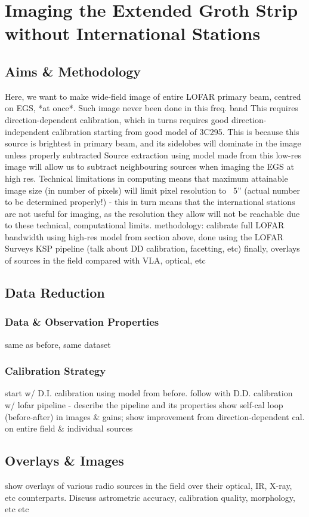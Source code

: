 \chapter{Imaging the Extended Groth Strip without International Stations}

\section{Aims \& Methodology}

\pg
Here, we want to make wide-field image of entire LOFAR primary beam, centred on EGS, *at once*. Such image never been done in this freq. band
\pg
This requires direction-dependent calibration, which in turns requires good direction-independent calibration starting from good model of 3C295. This is because this source is brightest in primary beam, and its sidelobes will dominate in the image unless properly subtracted
\pg
Source extraction using model made from this low-res image will allow us to subtract neighbouring sources when imaging the EGS at high res.
\pg
Technical limitations in computing means that maximum attainable image size (in number of pixels) will limit pixel resolution to ~5'' (actual number to be determined properly!) - this in turn means that the international stations are not useful for imaging, as the resolution they allow will not be reachable due to these technical, computational limits.
\pg
methodology: calibrate full LOFAR bandwidth using high-res model from section above, done using the LOFAR Surveys KSP pipeline (talk about DD calibration, facetting, etc)
finally, overlays of sources in the field compared with VLA, optical, etc


\section{Data Reduction}

\subsection{Data \& Observation Properties}
same as before, same dataset

\subsection{Calibration Strategy}

\pg
start w/ D.I. calibration using model from before.
\pg
follow with D.D. calibration w/ lofar pipeline - describe the pipeline and its properties
\pg
show self-cal loop (before-after) in images \& gains; show improvement from direction-dependent cal. on entire field \& individual sources



\section{Overlays \& Images}

\pg
show overlays of various radio sources in the field over their optical, IR, X-ray, etc counterparts. Discuss astrometric accuracy, calibration quality, morphology, etc etc


\newpage